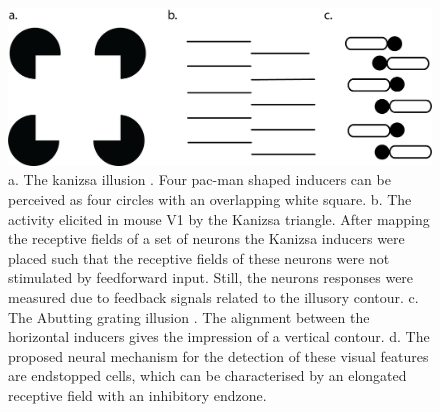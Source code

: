 \documentclass[12pt]{article}
\begin{document}
\begin{figure}[H]
    \centering
    \includegraphics[width=1.0\textwidth]{adjusted_figures/illusory_figure.png}
    \caption{a. The kanizsa illusion \autocite{kanizsaSubjectiveContours1976}. Four pac-man shaped inducers can be perceived as four circles with an overlapping white square. b. The activity elicited in mouse V1 by the Kanizsa triangle. After mapping the receptive fields of a set of neurons the Kanizsa inducers were placed such that the receptive fields of these neurons were not stimulated by feedforward input. Still, the neurons responses were measured due to feedback signals related to the illusory contour.
    c. The Abutting grating illusion \autocite{sorianoAbuttingGratingIllusion1996}. The alignment between the horizontal inducers gives the impression of a vertical contour. d. The proposed neural mechanism for the detection of these visual features are endstopped cells, which can be characterised by an elongated receptive field with an inhibitory endzone.}
    \label{fig:figure_1}
\end{figure}



\end{document}
